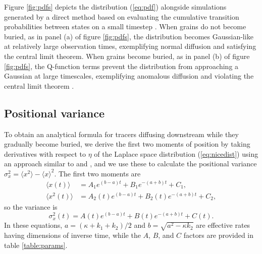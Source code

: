 \documentclass[grl]{agujournal2018}
\newcommand\be{\begin{equation}}
\newcommand\ee{\end{equation}}
\newcommand\bra{\langle}
\newcommand\ket{\rangle}
\begin{document}
Figure \ref{fig:pdfs} depicts the distribution (\ref{eq:pdf}) alongside simulations generated by a direct method based on evaluating the cumulative transition probabilities between states on a small timestep \citep{Barik2006}.
When grains do not become buried, as in panel (a) of figure \ref{fig:pdfs}, the distribution becomes Gaussian-like at relatively large observation times, exemplifying normal diffusion and satisfying the central limit theorem.
When grains become buried, as in panel (b) of figure \ref{fig:pdfs},  the Q-function terms prevent the distribution from approaching a Gaussian at large timescales, exemplifying anomalous diffusion \citep{Weeks1998} and violating the central limit theorem \citep{Metzler2000,Schumer2009}.


\subsection{Positional variance}

To obtain an analytical formula for tracers diffusing downstream while they gradually become buried, we derive the first two moments of position by taking derivatives with respect to $\eta$ of the Laplace space distribution (\ref{eq:nicedist}) using an approach similar to \citet{Shlesinger1974} and \citet{Weeks1998}, and we use these to calculate the positional variance $\sigma_x^2 = \bra x^2\ket - \bra x \ket^2$. 
The first two moments are
\begin{align}
\bra x(t) \ket &= A_1 e^{(b-a)t}+B_1e^{-(a+b)t}+C_1, \label{eq:mean}\\
\bra x^2(t) \ket &= A_2(t)e^{(b-a)t}+B_2(t)e^{-(a+b)t}+C_2, \label{eq:second}
\end{align}
so the variance is 
\be \sigma_x^2(t) = A(t)e^{(b-a)t} + B(t)e^{-(a+b)t} + C(t). \label{eq:var}\ee
In these equations, $a = (\kappa + k_1+k_2)/2$ and $b = \sqrt{a^2-\kappa k_2}$ are effective rates having dimensions of inverse time, while the $A$, $B$, and $C$ factors are provided in table \ref{table:params}.
\end{document}
